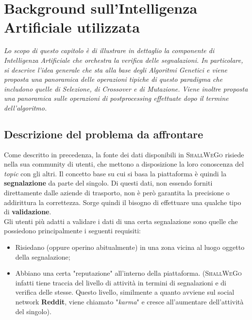 \chapter{Background sull'Intelligenza Artificiale utilizzata} %
%

\begin{citazione}
    \textit{Lo scopo di questo capitolo è di illustrare in dettaglio la componente di Intelligenza Artificiale che orchestra la verifica delle segnalazioni. In particolare, si descrive l'idea generale che sta alla base degli Algoritmi Genetici e viene proposta una panoramica delle operazioni tipiche di questo paradigma che includono quelle di Selezione, di Crossover e di Mutazione. Viene inoltre proposta una panoramica sulle operazioni di postprocessing effettuate dopo il termine dell'algoritmo.}
\end{citazione}

\newpage

\section{Descrizione del problema da affrontare}
    Come descritto in precedenza, la fonte dei dati disponibili in \textsc{ShallWeGo} risiede nella sua community di utenti, che mettono a disposizione la loro conoscenza del \textit{topic} con gli altri. Il concetto base su cui si basa la piattaforma è quindi la \textbf{segnalazione} da parte del singolo. Di questi dati, non essendo forniti direttamente dalle aziende di trasporto, non è però garantita la precisione o addirittura la correttezza. Sorge quindi il bisogno di effettuare una qualche tipo di \textbf{validazione}. \\
    Gli utenti più adatti a validare i dati di una certa segnalazione sono quelle che possiedono principalmente i seguenti requisiti:
    \begin{itemize}
        \item Risiedano (oppure operino abitualmente) in una zona vicina al luogo oggetto della segnalazione;
        \item Abbiano una certa "reputazione" all'interno della piattaforma. (\textsc{ShallWeGo} infatti tiene traccia del livello di attività in termini di segnalazioni e di verifica delle stesse. Questo livello, similmente a quanto avviene sul social network \textbf{Reddit}, viene chiamato "\textit{karma}" e cresce all'aumentare dell'attività del singolo).
    \end{itemize}

